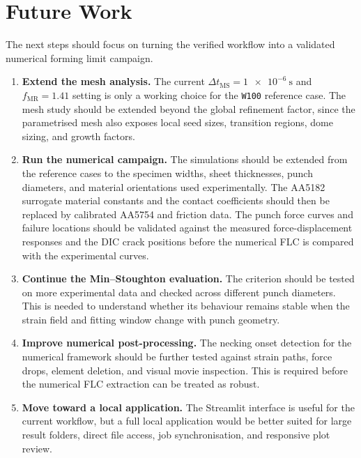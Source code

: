 \chapter{Future Work}\label{chap:future_work}

The next steps should focus on turning the verified workflow into a validated
numerical forming limit campaign.

\begin{enumerate}
  \item \textbf{Extend the mesh analysis.} The current
  $\Delta t_\mathrm{MS}=\SI{1e-6}{\second}$ and $f_\mathrm{MR}=1.41$ setting is
  only a working choice for the \texttt{W100} reference case. The mesh study
  should be extended beyond the global refinement factor, since the parametrised
  mesh also exposes local seed sizes, transition regions, dome sizing, and
  growth factors.

  \item \textbf{Run the numerical campaign.} The simulations should be extended
  from the reference cases to the specimen widths, sheet thicknesses, punch
  diameters, and material orientations used experimentally. The AA5182
  surrogate material constants and the contact coefficients should then be
  replaced by calibrated AA5754 and friction data. The punch force curves and
  failure locations should be validated against the measured
  force-displacement responses and the DIC crack positions before the
  numerical FLC is compared with the experimental curves.

  \item \textbf{Continue the Min--Stoughton evaluation.} The criterion should be
  tested on more experimental data and checked across different punch
  diameters. This is needed to understand whether its behaviour remains stable
  when the strain field and fitting window change with punch geometry.

  \item \textbf{Improve numerical post-processing.} The necking onset detection
  for the numerical framework should be further tested against strain paths,
  force drops, element deletion, and visual movie inspection. This is required
  before the numerical FLC extraction can be treated as robust.

  \item \textbf{Move toward a local application.} The Streamlit interface is
  useful for the current workflow, but a full local application would be better
  suited for large result folders, direct file access, job synchronisation, and
  responsive plot review.
\end{enumerate}
